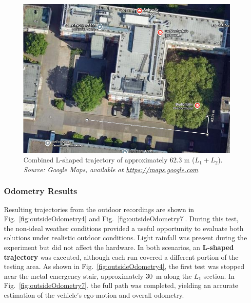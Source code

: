 \begin{figure}[!htbp]
    \centering
    \includegraphics[width=0.9\linewidth]{images/FH_ParkingLot_TotalDistance.png}
    \caption{Combined L-shaped trajectory of approximately 62.3 m ($L_1 + L_2$).\\
    \textit{Source: Google Maps, available at \url{https://maps.google.com} \cite{googlemaps_fhdo}}}
    \label{fig:parkinglot_totaldistance}
\end{figure}

\subsubsection{Odometry Results}
Resulting trajectories from the outdoor recordings are shown in Fig.~\ref{fig:outsideOdometry4} and Fig.~\ref{fig:outsideOdometry7}.
During this test, the non-ideal weather conditions provided a useful opportunity to evaluate both solutions under realistic outdoor conditions.
Light rainfall was present during the experiment but did not affect the hardware.
In both scenarios, an \textbf{L-shaped trajectory} was executed, although each run covered a different portion of the testing area.
As shown in Fig.~\ref{fig:outsideOdometry4}, the first test was stopped near the metal emergency stair, approximately \SI{30}{\meter} along the $L_1$ section.
In Fig.~\ref{fig:outsideOdometry7}, the full path was completed, yielding an accurate estimation of the vehicle’s ego-motion and overall odometry.

